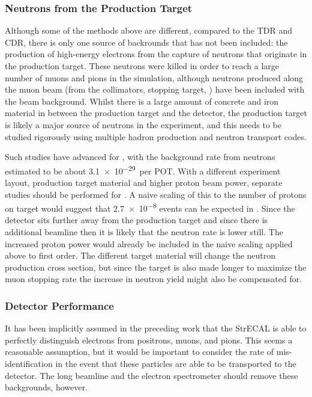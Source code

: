 \subsubsection*{Neutrons from the Production Target}
Although some of the methods above are different, compared to the \phaseI TDR and \phaseII CDR, there is only one source of backrounds that has not been included:
the production of high-energy electrons from the capture of neutrons that originate in the production target.
These neutrons were killed in order to reach a large number of muons and pions in the simulation, although neutrons produced along the muon beam (from the collimators, stopping target, \etc) have been included with the beam background.
Whilst there is a large amount of concrete and iron material in between the production target and the detector, the production target is likely a major source of neutrons in the experiment, and this needs to be studied rigorously using multiple hadron production and neutron transport codes.

Such studies have advanced for \phaseI, with the background rate from neutrons estimated to be about \num{3.1e-29}~per POT.
With a different experiment layout, production target material and higher proton beam power, separate studies should be performed  for \phaseII.
A naive scaling of this to the \phaseII number of protons on target would suggest that \num{2.7e-8} events can be expected in \phaseII.
Since the detector sits further away from the production target and since there is additional beamline then it is likely that the neutron rate is lower still.
The increased proton power would already be included in the naive scaling applied above to first order.
The different target material will change the neutron production cross section, but since the target is also made longer to maximize the muon stopping rate the increase in neutron yield might also be compensated for.

\subsubsection*{Detector Performance}
It has been implicitly assumed in the preceding work that the StrECAL is able to perfectly distinguish electrons from positrons, muons, and pions.
This seems a reasonable assumption, but it would be important to consider the rate of mis-identification in the event that these particles are able to be transported to the detector.
The long beamline and the electron spectrometer should remove these backgrounds, however.

